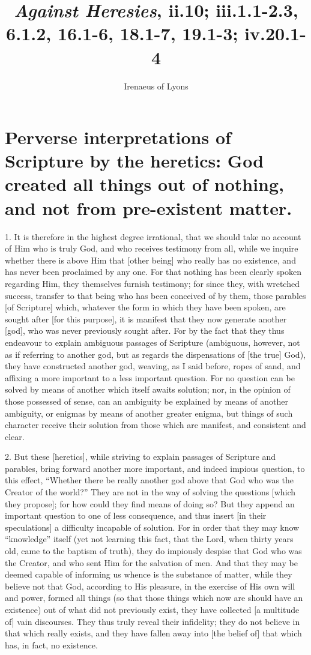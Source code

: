 \documentclass[9pt, twocolumn, oneside, a4paper]{memoir}
\title{\textit{Against Heresies}, ii.10; iii.1.1-2.3, 6.1.2, 16.1-6, 18.1-7, 19.1-3; iv.20.1-4}
\author{ Irenaeus of Lyons}
\date{}
\begin{document}
\maketitle
\section*{Perverse interpretations of Scripture by the heretics: God created all things out of nothing, and not from pre-existent matter.}


1. It is therefore in the highest degree irrational, that we should take no account of Him who is truly God, and who receives testimony from all, while we inquire whether there is above Him that [other being] who really has no existence, and has never been proclaimed by any one. For that nothing has been clearly spoken regarding Him, they themselves furnish testimony; for since they, with wretched success, transfer to that being who has been conceived of by them, those parables [of Scripture] which, whatever the form in which they have been spoken, are sought after [for this purpose], it is manifest that they now generate another [god], who was  never previously sought after. For by the fact that they thus endeavour to explain ambiguous passages of Scripture (ambiguous, however, not as if referring to another god, but as regards the dispensations of [the true] God), they have constructed another god, weaving, as I said before, ropes of sand, and affixing a more important to a less important question. For no question can be solved by means of another which itself awaits solution; nor, in the opinion of those possessed of sense, can an ambiguity be explained by means of another ambiguity, or enigmas by means of another greater enigma, but things of such character receive their solution from those which are manifest, and consistent and clear.

2. But these [heretics], while striving to explain passages of Scripture and parables, bring forward another more important, and indeed impious question, to this effect, ``Whether there be really another god above that God who was the Creator of the world?'' They are not in the way of solving the questions [which they propose]; for how could they find means of doing so? But they append an important question to one of less consequence, and thus insert [in their speculations] a difficulty incapable of solution. For in order that they may  know ``knowledge'' itself (yet not learning this fact, that the Lord, when thirty years old, came to the baptism of truth), they do impiously despise that God who was the Creator, and who sent Him for the salvation of men. And that they may be deemed capable of informing us whence is the substance of matter, while they believe not that God, according to His pleasure, in the exercise of His own will and power, formed all things (so that those things which now are should have an existence) out of what did not previously exist, they have collected [a multitude of] vain discourses. They thus truly reveal their infidelity; they do not believe in that which really exists, and they have fallen away into [the belief of] that which has, in fact, no existence.
\end{document}
